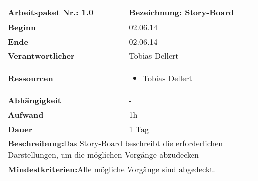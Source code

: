 \documentclass[fontsize=12pt,paper=a4,twoside]{scrartcl}
\begin{document}
\begin{verbatim} 
\end{verbatim}

\begin{tabular}{|p{5.3cm}|p{9.7cm}|}\hline
	\textbf{Arbeitspaket Nr.:} 1.0 & \textbf{Bezeichnung:} Story-Board\\ \hline \hline
	\textbf{Beginn} & 02.06.14\\ \hline
	\textbf{Ende} & 02.06.14\\ \hline
	\textbf{Verantwortlicher} & Tobias Dellert\\ \hline
	\textbf{Ressourcen} & \begin{itemize}
		\item Tobias Dellert
	\end{itemize}    \\ \hline
	\textbf{Abhängigkeit} & -\\ \hline
	\textbf{Aufwand} & 1h\\ \hline
	\textbf{Dauer} & 1 Tag\\ \hline
	\multicolumn{2}{|p{15cm}|}{\textbf{Beschreibung:}\newline  Das Story-Board beschreibt die erforderlichen Darstellungen, um die möglichen Vorgänge abzudecken }\\ \hline
	\multicolumn{2}{|p{15cm}|}{\textbf{Mindestkriterien:}\newline Alle mögliche Vorgänge sind abgedeckt. }\\ \hline
\end{tabular}

\begin{verbatim} 
\end{verbatim}
\end{document}
